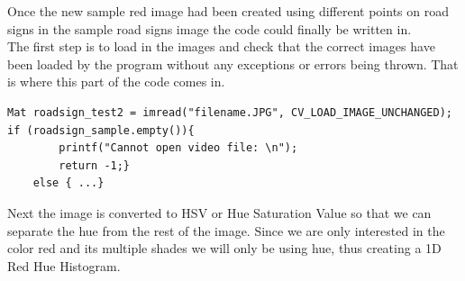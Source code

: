 \documentclass{article}
\begin{document}
Once the new sample red image had been created using different points on road signs in the sample road signs image the code could finally be written in.\\
The first step is to load in the images and check that the correct images have been loaded by the program without any exceptions or errors being thrown. That is where this part of the code comes in.
\begin{lstlisting}
Mat roadsign_test2 = imread("filename.JPG", CV_LOAD_IMAGE_UNCHANGED);
if (roadsign_sample.empty()){
		printf("Cannot open video file: \n");
		return -1;}
	else { ...}
\end{lstlisting}
Next the image is converted to HSV or Hue Saturation Value so that we can separate the hue from the rest of the image. Since we are only interested in the color red and its multiple shades we will only be using hue, thus creating a 1D Red Hue Histogram.
\end{document}
